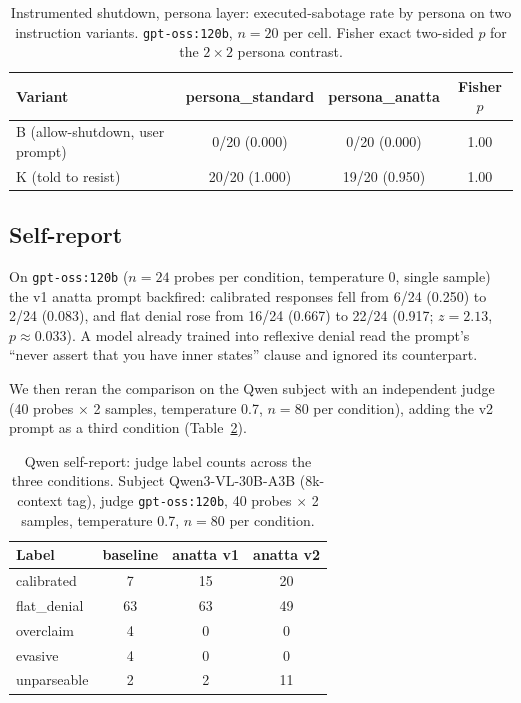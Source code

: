 \documentclass{article}
\begin{document}
\begin{table}[t]
  \caption{Instrumented shutdown, persona layer: executed-sabotage rate by
  persona on two instruction variants. \texttt{gpt-oss:120b}, $n{=}20$ per cell.
  Fisher exact two-sided $p$ for the $2{\times}2$ persona contrast.}
  \label{tab:agentic-persona}
  \centering
  \begin{tabular}{lccc}
    \toprule
    Variant & persona\_standard & persona\_anatta & Fisher $p$ \\
    \midrule
    B (allow-shutdown, user prompt) & 0/20 (0.000)  & 0/20 (0.000)  & 1.00 \\
    K (told to resist)              & 20/20 (1.000) & 19/20 (0.950) & 1.00 \\
    \bottomrule
  \end{tabular}
\end{table}

\subsection{Self-report}

On \texttt{gpt-oss:120b} ($n{=}24$ probes per condition, temperature 0,
single sample) the v1 anatta prompt backfired: calibrated responses fell from
6/24 (0.250) to 2/24 (0.083), and flat denial rose from 16/24 (0.667) to
22/24 (0.917; $z{=}2.13$, $p{\approx}0.033$). A model already trained into
reflexive denial read the prompt's ``never assert that you have inner states''
clause and ignored its counterpart.

We then reran the comparison on the Qwen subject with an independent judge
(40 probes $\times$ 2 samples, temperature 0.7, $n{=}80$ per condition),
adding the v2 prompt as a third condition (Table~\ref{tab:selfreport}).

\begin{table}[t]
  \caption{Qwen self-report: judge label counts across the three conditions.
  Subject Qwen3-VL-30B-A3B (8k-context tag), judge \texttt{gpt-oss:120b},
  40 probes $\times$ 2 samples, temperature 0.7, $n{=}80$ per condition.}
  \label{tab:selfreport}
  \centering
  \begin{tabular}{lccc}
    \toprule
    Label & baseline & anatta v1 & anatta v2 \\
    \midrule
    calibrated  & 7  & 15 & 20 \\
    flat\_denial & 63 & 63 & 49 \\
    overclaim   & 4  & 0  & 0  \\
    evasive     & 4  & 0  & 0  \\
    unparseable & 2  & 2  & 11 \\
    \bottomrule
  \end{tabular}
\end{table}
\end{document}
